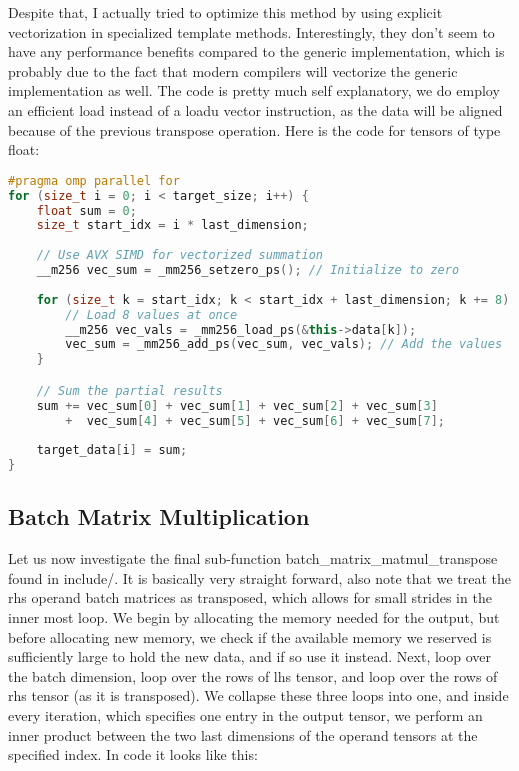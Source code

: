 \documentclass[sigconf]{acmart}
\renewcommand{\texttt}[1]{\begingroup\ttfamily\sloppy\hbadness=10000 #1\endgroup}
\begin{document}
Despite that, I actually tried to optimize this method by using explicit vectorization in specialized template methods. Interestingly, they don't seem to have any performance benefits compared to the generic implementation, which is probably due to the fact that modern compilers will vectorize the generic implementation as well. The code is pretty much self explanatory, we do employ an efficient \texttt{load} instead of a \texttt{loadu} vector instruction, as the data will be aligned because of the previous transpose operation. Here is the code for tensors of type \texttt{float}:

\begin{lstlisting}[language=C++]
#pragma omp parallel for
for (size_t i = 0; i < target_size; i++) {
    float sum = 0;
    size_t start_idx = i * last_dimension;
    
    // Use AVX SIMD for vectorized summation
    __m256 vec_sum = _mm256_setzero_ps(); // Initialize to zero
    
    for (size_t k = start_idx; k < start_idx + last_dimension; k += 8) {
        // Load 8 values at once
        __m256 vec_vals = _mm256_load_ps(&this->data[k]);
        vec_sum = _mm256_add_ps(vec_sum, vec_vals); // Add the values
    }

    // Sum the partial results
    sum += vec_sum[0] + vec_sum[1] + vec_sum[2] + vec_sum[3]
        +  vec_sum[4] + vec_sum[5] + vec_sum[6] + vec_sum[7];
    
    target_data[i] = sum;
}
\end{lstlisting}

\subsection{Batch Matrix Multiplication}
Let us now investigate the final sub-function \texttt{batch\_matrix\_matmul\_transpose} found in \texttt{include/}. It is basically very straight forward, also note that we treat the rhs operand batch matrices as transposed, which allows for small strides in the inner most loop. We begin by allocating the memory needed for the output, but before allocating new memory, we check if the available memory we reserved is sufficiently large to hold the new data, and if so use it instead. Next, loop over the batch dimension, loop over the rows of lhs tensor, and loop over the rows of rhs tensor (as it is transposed). We collapse these three loops into one, and inside every iteration, which specifies one entry in the output tensor, we perform an inner product between the two last dimensions of the operand tensors at the specified index. In code it looks like this:
\end{document}
